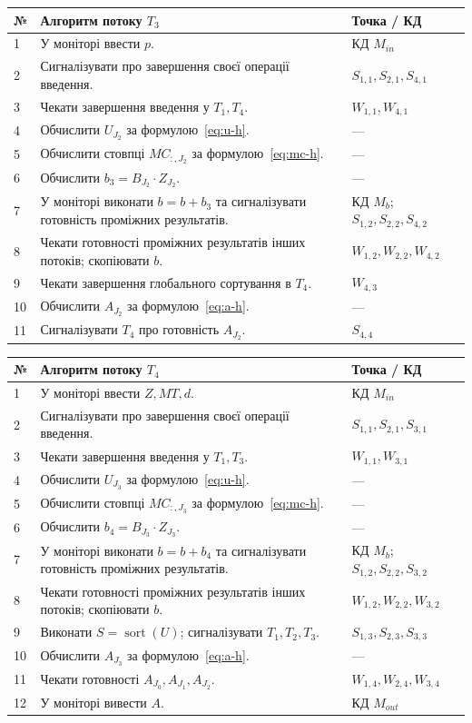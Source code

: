 \documentclass[12pt,a4paper]{article}
\begin{document}
\begin{longtable}{|p{0.65cm}|p{10.6cm}|p{3.0cm}|}
\hline
\textbf{№}&\textbf{Алгоритм потоку $T_3$}&\textbf{Точка / КД}\\\hline
1&У моніторі ввести $p$.&КД $M_{in}$\\\hline
2&Сигналізувати про завершення своєї операції введення.&$S_{1,1},S_{2,1},S_{4,1}$\\\hline
3&Чекати завершення введення у $T_1,T_4$.&$W_{1,1},W_{4,1}$\\\hline
4&Обчислити $U_{J_2}$ за формулою~\eqref{eq:u-h}.&---\\\hline
5&Обчислити стовпці $MC_{:,J_2}$ за формулою~\eqref{eq:mc-h}.&---\\\hline
6&Обчислити $b_3=B_{J_2}\cdot Z_{J_2}$.&---\\\hline
7&У моніторі виконати $b=b+b_3$ та сигналізувати готовність проміжних результатів.&КД $M_b$; $S_{1,2},S_{2,2},S_{4,2}$\\\hline
8&Чекати готовності проміжних результатів інших потоків; скопіювати $b$.&$W_{1,2},W_{2,2},W_{4,2}$\\\hline
9&Чекати завершення глобального сортування в $T_4$.&$W_{4,3}$\\\hline
10&Обчислити $A_{J_2}$ за формулою~\eqref{eq:a-h}.&---\\\hline
11&Сигналізувати $T_4$ про готовність $A_{J_2}$.&$S_{4,4}$\\\hline
\end{longtable}

\begin{longtable}{|p{0.65cm}|p{10.6cm}|p{3.0cm}|}
\hline
\textbf{№}&\textbf{Алгоритм потоку $T_4$}&\textbf{Точка / КД}\\\hline
1&У моніторі ввести $Z,MT,d$.&КД $M_{in}$\\\hline
2&Сигналізувати про завершення своєї операції введення.&$S_{1,1},S_{2,1},S_{3,1}$\\\hline
3&Чекати завершення введення у $T_1,T_3$.&$W_{1,1},W_{3,1}$\\\hline
4&Обчислити $U_{J_3}$ за формулою~\eqref{eq:u-h}.&---\\\hline
5&Обчислити стовпці $MC_{:,J_3}$ за формулою~\eqref{eq:mc-h}.&---\\\hline
6&Обчислити $b_4=B_{J_3}\cdot Z_{J_3}$.&---\\\hline
7&У моніторі виконати $b=b+b_4$ та сигналізувати готовність проміжних результатів.&КД $M_b$; $S_{1,2},S_{2,2},S_{3,2}$\\\hline
8&Чекати готовності проміжних результатів інших потоків; скопіювати $b$.&$W_{1,2},W_{2,2},W_{3,2}$\\\hline
9&Виконати $S=\operatorname{sort}(U)$; сигналізувати $T_1,T_2,T_3$.&$S_{1,3},S_{2,3},S_{3,3}$\\\hline
10&Обчислити $A_{J_3}$ за формулою~\eqref{eq:a-h}.&---\\\hline
11&Чекати готовності $A_{J_0},A_{J_1},A_{J_2}$.&$W_{1,4},W_{2,4},W_{3,4}$\\\hline
12&У моніторі вивести $A$.&КД $M_{out}$\\\hline
\end{longtable}
\end{document}
